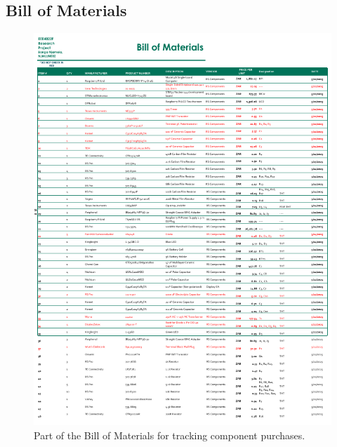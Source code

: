 \documentclass[class=report,11pt,crop=false]{standalone}
\begin{document}
	\subsection{Bill of Materials}
	\begin{figure}[ht!]
		\centering
		\includegraphics[width=1.0\linewidth]{Figures/Appendices/system-bom}
		\caption{Part of the Bill of Materials for tracking component purchases.}
		\label{fig:system-bom}
	\end{figure} 
\end{document}
